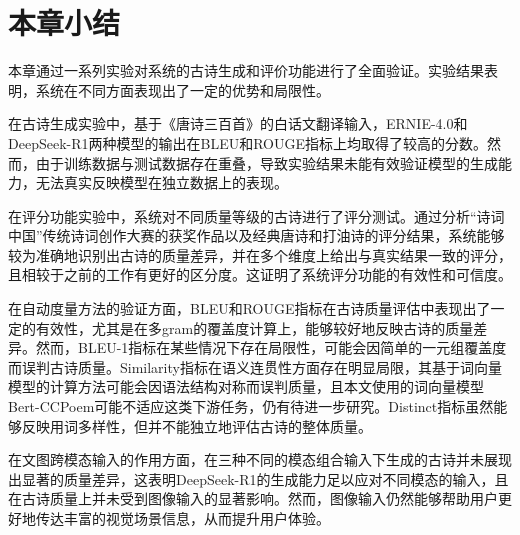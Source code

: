 \clearpage
\section{本章小结}

本章通过一系列实验对系统的古诗生成和评价功能进行了全面验证。实验结果表明，系统在不同方面表现出了一定的优势和局限性。

在古诗生成实验中，基于《唐诗三百首》的白话文翻译输入，ERNIE-4.0和DeepSeek-R1两种模型的输出在BLEU和ROUGE指标上均取得了较高的分数。然而，由于训练数据与测试数据存在重叠，导致实验结果未能有效验证模型的生成能力，无法真实反映模型在独立数据上的表现。

在评分功能实验中，系统对不同质量等级的古诗进行了评分测试。通过分析“诗词中国”传统诗词创作大赛的获奖作品以及经典唐诗和打油诗的评分结果，系统能够较为准确地识别出古诗的质量差异，并在多个维度上给出与真实结果一致的评分，且相较于之前的工作有更好的区分度。这证明了系统评分功能的有效性和可信度。

在自动度量方法的验证方面，BLEU和ROUGE指标在古诗质量评估中表现出了一定的有效性，尤其是在多gram的覆盖度计算上，能够较好地反映古诗的质量差异。然而，BLEU-1指标在某些情况下存在局限性，可能会因简单的一元组覆盖度而误判古诗质量。Similarity指标在语义连贯性方面存在明显局限，其基于词向量模型的计算方法可能会因语法结构对称而误判质量，且本文使用的词向量模型Bert-CCPoem可能不适应这类下游任务，仍有待进一步研究。Distinct指标虽然能够反映用词多样性，但并不能独立地评估古诗的整体质量。

在文图跨模态输入的作用方面，在三种不同的模态组合输入下生成的古诗并未展现出显著的质量差异，这表明DeepSeek-R1的生成能力足以应对不同模态的输入，且在古诗质量上并未受到图像输入的显著影响。然而，图像输入仍然能够帮助用户更好地传达丰富的视觉场景信息，从而提升用户体验。